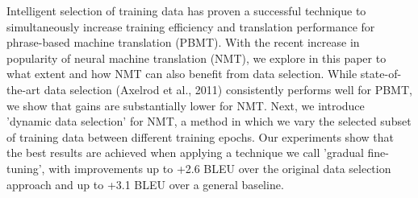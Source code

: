 Intelligent selection of training data has proven a successful technique to simultaneously increase training efficiency and translation performance for phrase-based machine translation (PBMT). With the recent increase in popularity of neural machine translation (NMT), we explore in this paper to what extent and how NMT can also benefit from data selection. While state-of-the-art data selection (Axelrod et al., 2011) consistently performs well for PBMT, we show that gains are substantially lower for NMT. Next, we introduce 'dynamic data selection' for NMT, a method in which we vary the selected subset of training data between different training epochs. Our experiments show that the best results are achieved when applying a technique we call 'gradual fine-tuning', with improvements up to +2.6 BLEU over the original data selection approach and up to +3.1 BLEU over a general baseline.
